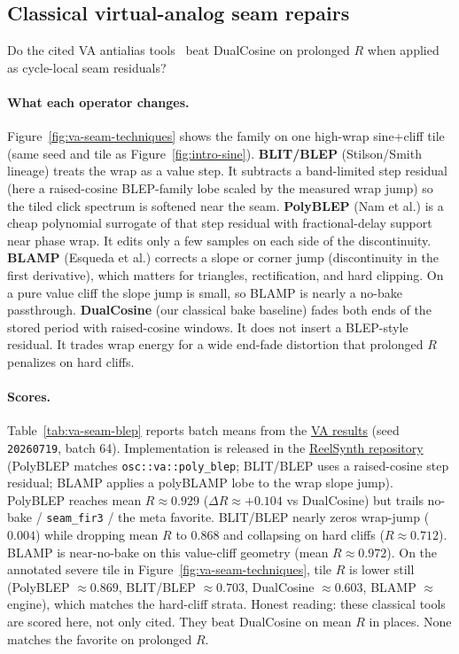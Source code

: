 \subsection{Classical virtual-analog seam repairs}
\label{sec:va-seam-baselines}

Do the cited VA antialias tools~\cite{stilson1996,nam2009polyblep,esqueda2016blamp} beat DualCosine on prolonged $R$ when applied as cycle-local seam residuals?

\paragraph{What each operator changes.}
Figure~\ref{fig:va-seam-techniques} shows the family on one high-wrap sine{+}cliff tile (same seed and tile as Figure~\ref{fig:intro-sine}).
\textbf{BLIT/BLEP} (Stilson/Smith lineage) treats the wrap as a value step.
It subtracts a band-limited step residual (here a raised-cosine BLEP-family lobe scaled by the measured wrap jump) so the tiled click spectrum is softened near the seam.
\textbf{PolyBLEP} (Nam et al.) is a cheap polynomial surrogate of that step residual with fractional-delay support near phase wrap.
It edits only a few samples on each side of the discontinuity.
\textbf{BLAMP} (Esqueda et al.) corrects a slope or corner jump (discontinuity in the first derivative), which matters for triangles, rectification, and hard clipping.
On a pure value cliff the slope jump is small, so BLAMP is nearly a no-bake passthrough.
\textbf{DualCosine} (our classical bake baseline) fades both ends of the stored period with raised-cosine windows.
It does not insert a BLEP-style residual.
It trades wrap energy for a wide end-fade distortion that prolonged $R$ penalizes on hard cliffs.

\paragraph{Scores.}
Table~\ref{tab:va-seam-blep} reports batch means from the \href{https://github.com/reeldemo/denoise-opt-meta/blob/master/paper/Unsupervised_Wavetable_Seam_Artifact_Repair_via_Hybrid_GA-PPO_Meta-Search_v10/figures/va_seam_blep.json}{VA results} (seed \texttt{20260719}, batch 64).
Implementation is released in the \href{https://github.com/reeldemo/reelsynth}{ReelSynth repository} (PolyBLEP matches \texttt{osc::va::poly\_blep}; BLIT/BLEP uses a raised-cosine step residual; BLAMP applies a polyBLAMP lobe to the wrap slope jump).
PolyBLEP reaches mean $R\approx 0.929$ ($\Delta R\approx{+}0.104$ vs DualCosine) but trails no-bake / \texttt{seam\_fir3} / the meta favorite.
BLIT/BLEP nearly zeros wrap-jump ($0.004$) while dropping mean $R$ to $0.868$ and collapsing on hard cliffs ($R\approx 0.712$).
BLAMP is near-no-bake on this value-cliff geometry (mean $R\approx 0.972$).
On the annotated severe tile in Figure~\ref{fig:va-seam-techniques}, tile $R$ is lower still (PolyBLEP $\approx 0.869$, BLIT/BLEP $\approx 0.703$, DualCosine $\approx 0.603$, BLAMP $\approx$ engine), which matches the hard-cliff strata.
Honest reading: these classical tools are scored here, not only cited.
They beat DualCosine on mean $R$ in places.
None matches the favorite on prolonged $R$.

